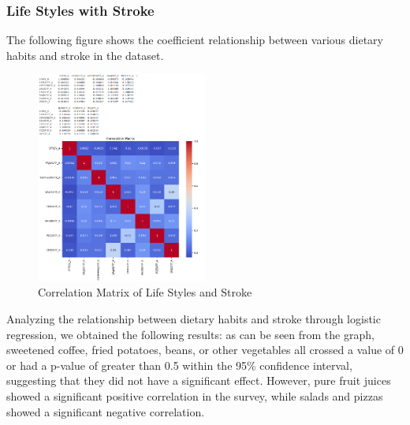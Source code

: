 \documentclass{article}
\begin{document}
\subsubsection{Life Styles with Stroke}

The following figure shows the coefficient relationship between various dietary habits and stroke in the dataset.
\newpage
\begin{figure}[!h]
	\centering
	\includegraphics[width=0.5\textwidth]{../Image/P34.jpg}
	\caption{Correlation Matrix of Life Styles and Stroke}
	\label{fig:P34}
\end{figure}





Analyzing the relationship between dietary habits and stroke through logistic regression, we obtained the following results: as can be seen from the graph, sweetened coffee, fried potatoes, beans, or other vegetables all crossed a value of 0 or had a p-value of greater than 0.5 within the 95\% confidence interval, suggesting that they did not have a significant effect. However, pure fruit juices showed a significant positive correlation in the survey, while salads and pizzas showed a significant negative correlation.
\end{document}
